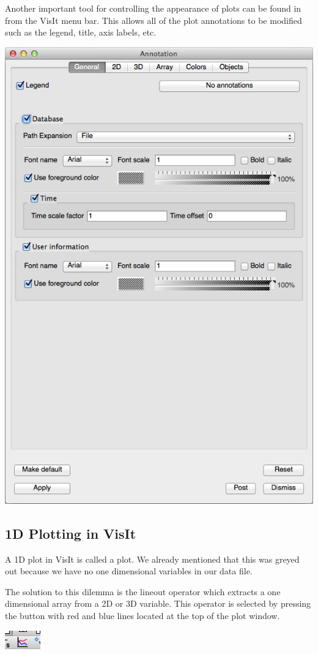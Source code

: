   Another important tool for controlling the appearance of plots can
  be found in  from the VisIt menu
  bar. This allows all of the plot annotations to be modified such as
  the legend, title, axis labels, etc.
  \begin{center}
    \includegraphics[width=0.6\linewidth]{images/visit_annot}
  \end{center}

\subsection{1D Plotting in VisIt}
  A 1D plot in VisIt is called a  plot. We already mentioned that
  this was greyed out because we have no one dimensional variables in our
  data file.

  The solution to this dilemma is the lineout operator which extracts a
  one dimensional array from a 2D or 3D variable. This operator is selected
  by pressing the button with red and blue lines located at the top of
  the plot window.
  \begin{center}\includegraphics{images/visit_lineout}\end{center}

